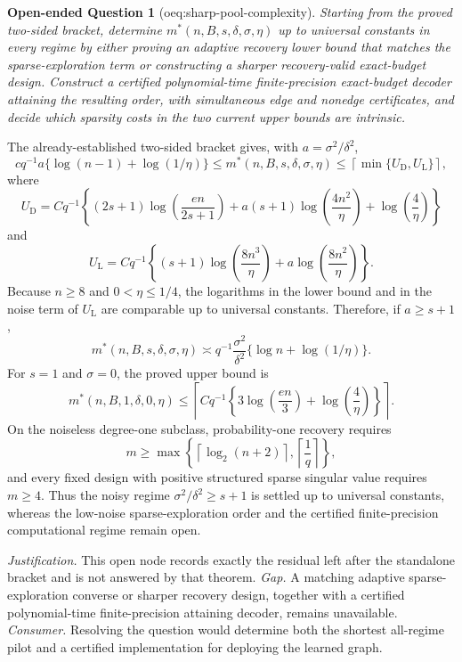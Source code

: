 \documentclass{article}
\newtheorem{openendedquestion}{Open-ended Question}
\begin{document}
\begin{openendedquestion}[oeq:sharp-pool-complexity]\label{oeq:sharp-pool-complexity}
Starting from the proved two-sided bracket, determine \(m^*(n,B,s,\delta,\sigma,\eta)\) up to universal constants in every regime by either proving an adaptive recovery lower bound that matches the sparse-exploration term or constructing a sharper recovery-valid exact-budget design. Construct a certified polynomial-time finite-precision exact-budget decoder attaining the resulting order, with simultaneous edge and nonedge certificates, and decide which sparsity costs in the two current upper bounds are intrinsic.
\end{openendedquestion}
The already-established two-sided bracket gives, with \(a=\sigma^2/\delta^2\),
\[
 c q^{-1}a\{\log(n-1)+\log(1/\eta)\}
 \le m^*(n,B,s,\delta,\sigma,\eta)
 \le \left\lceil\min\{U_{\mathrm D},U_{\mathrm L}\}\right\rceil,
\]
where
\[
 U_{\mathrm D}=Cq^{-1}\left\{(2s+1)\log\!\left(\frac{en}{2s+1}\right)
 +a(s+1)\log\!\left(\frac{4n^2}{\eta}\right)
 +\log\!\left(\frac4\eta\right)\right\}
\]
and
\[
 U_{\mathrm L}=Cq^{-1}\left\{(s+1)\log\!\left(\frac{8n^3}{\eta}\right)
 +a\log\!\left(\frac{8n^2}{\eta}\right)\right\}.
\]
Because \(n\ge8\) and \(0<\eta\le1/4\), the logarithms in the lower bound and in the noise term of \(U_{\mathrm L}\) are comparable up to universal constants. Therefore, if \(a\ge s+1\),
\[
 m^*(n,B,s,\delta,\sigma,\eta)
 \asymp q^{-1}\frac{\sigma^2}{\delta^2}
 \{\log n+\log(1/\eta)\}.
\]
For \(s=1\) and \(\sigma=0\), the proved upper bound is
\[
 m^*(n,B,1,\delta,0,\eta)
 \le
 \left\lceil Cq^{-1}\left\{3\log\!\left(\frac{en}{3}\right)
 +\log\!\left(\frac4\eta\right)\right\}\right\rceil.
\]
On the noiseless degree-one subclass, probability-one recovery requires
\[
 m\ge
 \max\!\left\{\left\lceil\log_2(n+2)\right\rceil,
 \left\lceil\frac1q\right\rceil\right\},
\]
and every fixed design with positive structured sparse singular value requires \(m\ge4\). Thus the noisy regime \(\sigma^2/\delta^2\ge s+1\) is settled up to universal constants, whereas the low-noise sparse-exploration order and the certified finite-precision computational regime remain open.
\par\smallskip\noindent \textit{Justification.} This open node records exactly the residual left after the standalone bracket and is not answered by that theorem. \textit{Gap.} A matching adaptive sparse-exploration converse or sharper recovery design, together with a certified polynomial-time finite-precision attaining decoder, remains unavailable. \textit{Consumer.} Resolving the question would determine both the shortest all-regime pilot and a certified implementation for deploying the learned graph.
\end{document}
